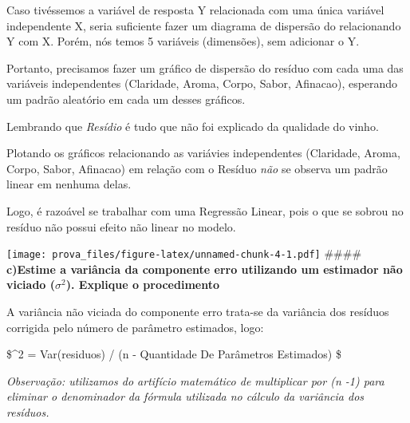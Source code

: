 \documentclass[
]{article}
\newenvironment{Shaded}{\begin{snugshade}}{\end{snugshade}}
\newcommand{\DataTypeTok}[1]{\textcolor[rgb]{0.13,0.29,0.53}{#1}}
\newcommand{\DecValTok}[1]{\textcolor[rgb]{0.00,0.00,0.81}{#1}}
\newcommand{\FloatTok}[1]{\textcolor[rgb]{0.00,0.00,0.81}{#1}}
\newcommand{\KeywordTok}[1]{\textcolor[rgb]{0.13,0.29,0.53}{\textbf{#1}}}
\newcommand{\NormalTok}[1]{#1}
\newcommand{\OperatorTok}[1]{\textcolor[rgb]{0.81,0.36,0.00}{\textbf{#1}}}
\newcommand{\StringTok}[1]{\textcolor[rgb]{0.31,0.60,0.02}{#1}}
\begin{document}
Caso tivéssemos a variável de resposta Y relacionada com uma única
variável independente X, seria suficiente fazer um diagrama de dispersão
do relacionando Y com X. Porém, nós temos 5 variáveis (dimensões), sem
adicionar o Y.

Portanto, precisamos fazer um gráfico de dispersão do resíduo com cada
uma das variáveis independentes (Claridade, Aroma, Corpo, Sabor,
Afinacao), esperando um padrão aleatório em cada um desses gráficos.

Lembrando que \emph{Resídio} é tudo que não foi explicado da qualidade
do vinho.

Plotando os gráficos relacionando as variávies independentes (Claridade,
Aroma, Corpo, Sabor, Afinacao) em relação com o Resíduo \emph{não} se
observa um padrão linear em nenhuma delas.

Logo, é razoável se trabalhar com uma Regressão Linear, pois o que se
sobrou no resíduo não possui efeito não linear no modelo.

\begin{Shaded}
\end{Shaded}

\texttt{[image: prova\_files/figure-latex/unnamed-chunk-4-1.pdf]}
\#\#\#\# \textbf{c)Estime a variância da componente erro utilizando um
estimador não viciado (\(\sigma^2\)). Explique o procedimento}

A variância não viciada do componente erro trata-se da variância dos
resíduos corrigida pelo número de parâmetro estimados, logo:

\$\sigma\^{}2 = Var(residuos) / (n - Quantidade De Parâmetros Estimados)
\$

\emph{Observação: utilizamos do artifício matemático de multiplicar por
(n -1) para eliminar o denominador da fórmula utilizada no cálculo da
variância dos resíduos.}

\begin{Shaded}
\end{Shaded}
\end{document}
